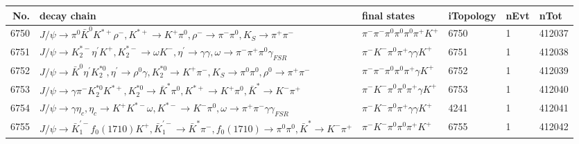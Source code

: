 \begin{table}[htbp] 
\begin{center}
\begin{small}
\begin{tabular}{rlllll}\hline\hline
 No. & decay chain & final states &  iTopology & nEvt & nTot \\\hline
6750&$J/\psi       \rightarrow \pi^{0}        \bar{K}^{0}   K^{*+}         \rho^{-}      , K^{*+}          \rightarrow K^{+}          \pi^{0}        , \rho^{-}       \rightarrow \pi^{-}        \pi^{0}        , K_{S}           \rightarrow \pi^{+}        \pi^{-}        $&$\pi^{-}        \pi^{-}        \pi^{0}        \pi^{0}        \pi^{0}        \pi^{+}        K^{+}          $& 6750&    1&412037\\
6751&$J/\psi       \rightarrow K_2^{*-}       \eta^{\prime} K^{+}          , K_2^{*-}        \rightarrow \omega         K^{-}          , \eta^{\prime}  \rightarrow \gamma       \gamma       , \omega          \rightarrow \pi^{-}        \pi^{+}        \pi^{0}        \gamma_{FSR} $&$\pi^{-}        K^{-}          \pi^{0}        \pi^{+}        \gamma       \gamma       K^{+}          $& 6751&    1&412038\\
6752&$J/\psi       \rightarrow \bar{K}^{0}   \eta^{\prime} K_2^{*0}       , \eta^{\prime}  \rightarrow \rho^{0}      \gamma       , K_2^{*0}        \rightarrow K^{+}          \pi^{-}        , K_{S}           \rightarrow \pi^{0}        \pi^{0}        , \rho^{0}       \rightarrow \pi^{+}        \pi^{-}        $&$\pi^{-}        \pi^{-}        \pi^{0}        \pi^{0}        \pi^{+}        \gamma       K^{+}          $& 6752&    1&412039\\
6753&$J/\psi       \rightarrow \gamma       \pi^{-}        K_2^{*0}       K^{*+}         , K_2^{*0}        \rightarrow \bar{K}^{*}   \pi^{0}        , K^{*+}          \rightarrow K^{+}          \pi^{0}        , \bar{K}^{*}    \rightarrow K^{-}          \pi^{+}        $&$\pi^{-}        K^{-}          \pi^{0}        \pi^{0}        \pi^{+}        \gamma       K^{+}          $& 6753&    1&412040\\
6754&$J/\psi       \rightarrow \gamma       \eta_{c}    , \eta_{c}     \rightarrow K^{+}          K^{*-}         \omega         , K^{*-}          \rightarrow K^{-}          \pi^{0}        , \omega          \rightarrow \pi^{+}        \pi^{-}        \gamma       \gamma_{FSR} $&$\pi^{-}        K^{-}          \pi^{0}        \pi^{+}        \gamma       \gamma       K^{+}          $& 4241&    1&412041\\
6755&$J/\psi       \rightarrow \bar{K}_1^{'-}f_{0}(1710)    K^{+}          , \bar{K}_1^{'-} \rightarrow \bar{K}^{*}   \pi^{-}        , f_{0}(1710)     \rightarrow \pi^{0}        \pi^{0}        , \bar{K}^{*}    \rightarrow K^{-}          \pi^{+}        $&$\pi^{-}        K^{-}          \pi^{0}        \pi^{0}        \pi^{+}        K^{+}          $& 6755&    1&412042\\

\end{tabular}
\end{small}
\end{center}
\end{table}
